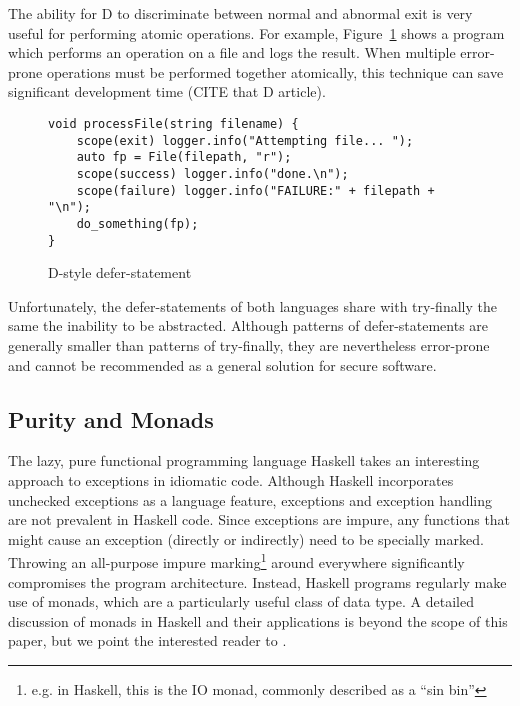 \documentclass[11pt]{article}
\begin{document}
The ability for D to discriminate between normal and abnormal exit is very useful for performing atomic operations.
For example, Figure~\ref{Dscope} shows a program which performs an operation on a file and logs the result.
When multiple error-prone operations must be performed together atomically, this technique can save significant development time (CITE that D article).

\begin{figure}
\caption{D-style defer-statement}
\label{Dscope}

\begin{verbatim}
void processFile(string filename) {
    scope(exit) logger.info("Attempting file... ");
    auto fp = File(filepath, "r");
    scope(success) logger.info("done.\n");
    scope(failure) logger.info("FAILURE:" + filepath + "\n");
    do_something(fp);
}
\end{verbatim}

\end{figure}

Unfortunately, the defer-statements of both languages share with try-finally the same the inability to be abstracted.
Although patterns of defer-statements are generally smaller than patterns of try-finally, they are nevertheless error-prone and cannot be recommended as a general solution for secure software.




\subsection{Purity and Monads}
\label{subsect:exceptionMonads}
The lazy, pure functional programming language Haskell takes an interesting approach to exceptions in idiomatic code.
Although Haskell incorporates unchecked exceptions as a language feature, exceptions and exception handling are not prevalent in Haskell code.
Since exceptions are impure, any functions that might cause an exception (directly or indirectly) need to be specially marked.
Throwing an all-purpose impure marking\footnote{e.g. in Haskell, this is the IO monad, commonly described as a ``sin bin''} around everywhere significantly compromises the program architecture.\cite{ReflectionWithoutRemorse}
Instead, Haskell programs regularly make use of monads, which are a particularly useful class of data type.
A detailed discussion of monads in Haskell and their applications is beyond the scope of this paper, but we point the interested reader to \cite{awkwardSquad}.
\end{document}
